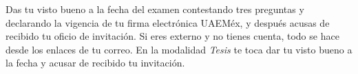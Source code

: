 \documentclass[11pt,a4paper]{article}
\begin{document}
{\small\tableofcontents}
\newpage
\begin{quevasahacer}
Das tu visto bueno a la fecha del examen contestando tres preguntas y declarando la vigencia de tu firma electrónica UAEMéx, y después acusas de recibido tu oficio de invitación. Si eres externo y no tienes cuenta, todo se hace desde los enlaces de tu correo. En la modalidad \emph{Tesis} te toca dar tu visto bueno a la fecha y acusar de recibido tu invitación.
\end{quevasahacer}




\end{document}
